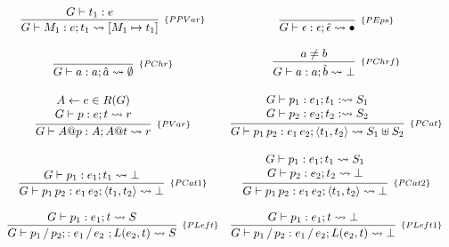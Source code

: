 \begin{figure}[H]
  \[
    \begin{array}{cc}
      \infer[_{\{PPVar\}}]{G\vdash M_1 : e ; t_1 \leadsto [M_1 \mapsto t_1]}{G \vdash t_1 : e} &
      \infer[_{\{PEps\}}]{G \vdash \epsilon : \epsilon ; \hat{\epsilon} \leadsto \bullet}{} \\ \\
      \infer[_{\{PChr\}}]{G\vdash a : a ; \hat{a} \leadsto \emptyset}{} &
      \infer[_{\{PChrf\}}]{G \vdash a : a  ; \hat{b} \leadsto \bot}{a \neq b}\\ \\
        \infer[_{\{PVar\}}]{G\vdash A@p : A ; A@t \leadsto r}
                        {\begin{array}{c}
                           A \leftarrow e \in R(G) \\
                           G\vdash p : e ; t \leadsto r
                         \end{array}}
        &
        \infer[_{\{PCat\}}]{G\vdash p_1\,p_2 : e_1\,e_2; \langle t_1, t_2 \rangle \leadsto S_1 \uplus S_2}
                        {\begin{array}{c}
                           G\vdash p_1 :e_1 ; t_1 : \leadsto S_1 \\
                           G\vdash p_2 :e_2 ; t_2 :\leadsto S_2
                        \end{array}}\\ \\
      \infer[_{\{PCat1\}}]{G\vdash p_1\,p_2 : e_1 \, e_2  ; \langle t_1, t_2 \rangle \leadsto \bot}
                      {G\vdash p_1 : e_1 ; t_1 \leadsto \bot} &
      \infer[_{\{PCat2\}}]{G\vdash p_1\,p_2 :e_1\,e_2 ; \langle t_1, t_2 \rangle \leadsto \bot}
                        {\begin{array}{c}
                            G\vdash p_1 :e_1 ; t_1 \leadsto S_1 \\
                            G\vdash p_2 :e_2 ; t_2\leadsto \bot
                         \end{array}} \\ \\
      \infer[_{\{PLeft\}}]{G \vdash p_1\,/\,p_2 ;: e_1\,/\,e_2\ ;L(e_2, t) \leadsto S}
                       {G\vdash p_1 :e_1 ; t\leadsto S} &
      \infer[_{\{PLeft1\}}]{G \vdash p_1\,/\,p_2 : e_1\,/\,e_2 ; L(e_2, t) \leadsto \bot}
                       {G\vdash p_1 :e_1 ; t \leadsto \bot} \\ \\

\end{array}\]
\end{figure}
